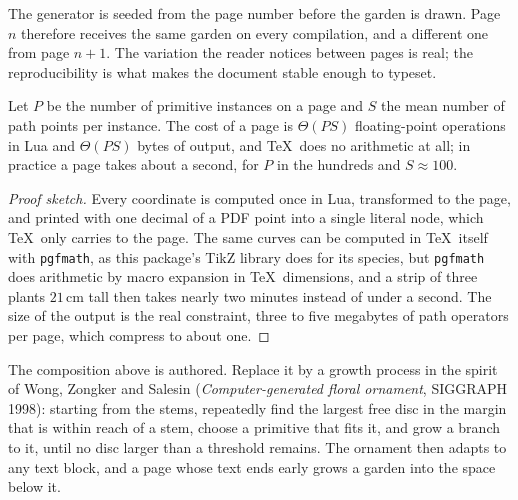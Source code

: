 \begin{remark}
The generator is seeded from the page number before the garden is drawn. Page $n$
therefore receives the same garden on every compilation, and a different one from page
$n+1$. The variation the reader notices between pages is real; the reproducibility is what
makes the document stable enough to typeset.
\end{remark}

\begin{proposition}
Let $P$ be the number of primitive instances on a page and $S$ the mean number of path
points per instance. The cost of a page is $\Theta(PS)$ floating-point operations in Lua and
$\Theta(PS)$ bytes of output, and \TeX\ does no arithmetic at all; in practice a page takes
about a second, for $P$ in the hundreds and $S\approx 100$.
\end{proposition}

\begin{proof}[Proof sketch]
Every coordinate is computed once in Lua, transformed to the page, and printed with one
decimal of a PDF point into a single literal node, which \TeX\ only carries to the page.
The same curves can be computed in \TeX\ itself with \texttt{pgfmath}, as this package's
TikZ library does for its species, but \texttt{pgfmath} does arithmetic by macro expansion in
\TeX\ dimensions, and a strip of three plants $21\,$cm tall then takes nearly two minutes
instead of under a second. The size of the output is the real constraint, three to five
megabytes of path operators per page, which compress to about one.
\end{proof}

\begin{exercise}
The composition above is authored. Replace it by a growth process in the spirit of Wong,
Zongker and Salesin (\emph{Computer-generated floral ornament}, SIGGRAPH 1998): starting
from the stems, repeatedly find the largest free disc in the margin that is within reach of
a stem, choose a primitive that fits it, and grow a branch to it, until no disc larger than
a threshold remains. The ornament then adapts to any text block, and a page whose text
ends early grows a garden into the space below it.
\end{exercise}
